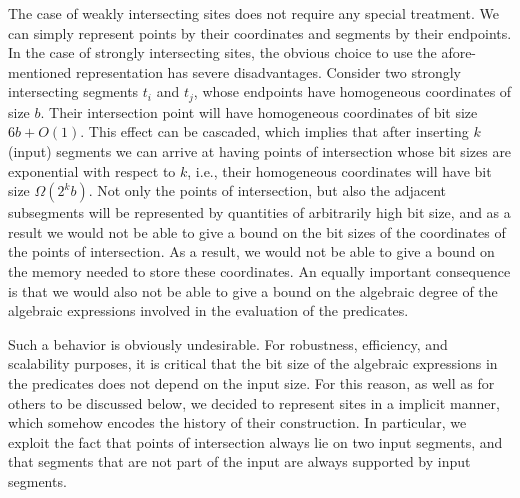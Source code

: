 The case of weakly intersecting sites does not require any special
treatment. We can simply represent points by their coordinates and
segments by their endpoints.
In the case of strongly intersecting sites,
the obvious choice to use the afore-mentioned representation
has severe disadvantages. Consider two
strongly intersecting segments $t_i$ and $t_j$, whose endpoints have
homogeneous coordinates of size $b$. Their intersection point will
have homogeneous coordinates of bit size $6b+O(1)$. This effect can be
cascaded, which implies that after inserting $k$ (input) segments we
can arrive at having points of intersection whose bit sizes are
exponential with respect to $k$, i.e., their homogeneous coordinates
will have bit size $\Omega(2^kb)$. Not only the points of
intersection, but also the adjacent subsegments will be represented by
quantities of arbitrarily high bit size, and as a result we would not
be able to give a bound on the bit sizes of the coordinates of the
points of intersection. As a result, we would not be able to give
a bound on the memory needed to store these coordinates. An equally
important consequence is that we would also not be able to give a
bound on the algebraic degree of the algebraic expressions involved in
the evaluation of the predicates.

Such a behavior is obviously undesirable. For robustness, efficiency,
and scalability purposes, it is critical that the bit size of the
algebraic expressions in the predicates does not depend on the input
size. For this reason, as well as for others to be discussed below,
we decided to represent sites in a implicit manner, which somehow
encodes the history of their construction. In particular, we exploit
the fact that points of intersection always lie on two input segments,
and that segments that are not part of the input are always supported
by input segments.

